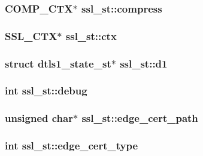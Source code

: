 \hypertarget{structssl__st_a62a49a9330502d045bbf6376c820225c}{
\subsubsection[{compress}]{\setlength{\rightskip}{0pt plus 5cm}C\-O\-M\-P\-\_\-\-C\-T\-X$\ast$ ssl\-\_\-st\-::compress}}\label{structssl__st_a62a49a9330502d045bbf6376c820225c}
\hypertarget{structssl__st_a5a3ac76eff749d5d3c9ecf6b1a230497}{
\subsubsection[{ctx}]{\setlength{\rightskip}{0pt plus 5cm}S\-S\-L\-\_\-\-C\-T\-X$\ast$ ssl\-\_\-st\-::ctx}}\label{structssl__st_a5a3ac76eff749d5d3c9ecf6b1a230497}
\hypertarget{structssl__st_afd70ab79ea0917b56fa74a8cb04ddaca}{
\subsubsection[{d1}]{\setlength{\rightskip}{0pt plus 5cm}struct dtls1\-\_\-state\-\_\-st$\ast$ ssl\-\_\-st\-::d1}}\label{structssl__st_afd70ab79ea0917b56fa74a8cb04ddaca}
\hypertarget{structssl__st_a44db2b5a38c43821c3a852669e48d67f}{
\subsubsection[{debug}]{\setlength{\rightskip}{0pt plus 5cm}int ssl\-\_\-st\-::debug}}\label{structssl__st_a44db2b5a38c43821c3a852669e48d67f}
\hypertarget{structssl__st_a53a83997e5d64f75f2ebe843fcb6f3cc}{
\subsubsection[{edge\-\_\-cert\-\_\-path}]{\setlength{\rightskip}{0pt plus 5cm}unsigned char$\ast$ ssl\-\_\-st\-::edge\-\_\-cert\-\_\-path}}\label{structssl__st_a53a83997e5d64f75f2ebe843fcb6f3cc}
\hypertarget{structssl__st_a2ba5be5897d7e9e40fad0c66b6e8622a}{
\subsubsection[{edge\-\_\-cert\-\_\-type}]{\setlength{\rightskip}{0pt plus 5cm}int ssl\-\_\-st\-::edge\-\_\-cert\-\_\-type}}\label{structssl__st_a2ba5be5897d7e9e40fad0c66b6e8622a}
